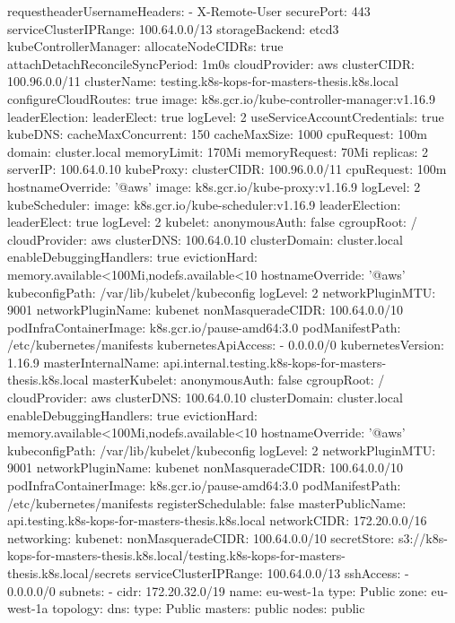     requestheaderUsernameHeaders:
    - X-Remote-User
    securePort: 443
    serviceClusterIPRange: 100.64.0.0/13
    storageBackend: etcd3
  kubeControllerManager:
    allocateNodeCIDRs: true
    attachDetachReconcileSyncPeriod: 1m0s
    cloudProvider: aws
    clusterCIDR: 100.96.0.0/11
    clusterName: testing.k8s-kops-for-masters-thesis.k8s.local
    configureCloudRoutes: true
    image: k8s.gcr.io/kube-controller-manager:v1.16.9
    leaderElection:
      leaderElect: true
    logLevel: 2
    useServiceAccountCredentials: true
  kubeDNS:
    cacheMaxConcurrent: 150
    cacheMaxSize: 1000
    cpuRequest: 100m
    domain: cluster.local
    memoryLimit: 170Mi
    memoryRequest: 70Mi
    replicas: 2
    serverIP: 100.64.0.10
  kubeProxy:
    clusterCIDR: 100.96.0.0/11
    cpuRequest: 100m
    hostnameOverride: '@aws'
    image: k8s.gcr.io/kube-proxy:v1.16.9
    logLevel: 2
  kubeScheduler:
    image: k8s.gcr.io/kube-scheduler:v1.16.9
    leaderElection:
      leaderElect: true
    logLevel: 2
  kubelet:
    anonymousAuth: false
    cgroupRoot: /
    cloudProvider: aws
    clusterDNS: 100.64.0.10
    clusterDomain: cluster.local
    enableDebuggingHandlers: true
    evictionHard: memory.available<100Mi,nodefs.available<10%
    hostnameOverride: '@aws'
    kubeconfigPath: /var/lib/kubelet/kubeconfig
    logLevel: 2
    networkPluginMTU: 9001
    networkPluginName: kubenet
    nonMasqueradeCIDR: 100.64.0.0/10
    podInfraContainerImage: k8s.gcr.io/pause-amd64:3.0
    podManifestPath: /etc/kubernetes/manifests
  kubernetesApiAccess:
  - 0.0.0.0/0
  kubernetesVersion: 1.16.9
  masterInternalName: api.internal.testing.k8s-kops-for-masters-thesis.k8s.local
  masterKubelet:
    anonymousAuth: false
    cgroupRoot: /
    cloudProvider: aws
    clusterDNS: 100.64.0.10
    clusterDomain: cluster.local
    enableDebuggingHandlers: true
    evictionHard: memory.available<100Mi,nodefs.available<10%
    hostnameOverride: '@aws'
    kubeconfigPath: /var/lib/kubelet/kubeconfig
    logLevel: 2
    networkPluginMTU: 9001
    networkPluginName: kubenet
    nonMasqueradeCIDR: 100.64.0.0/10
    podInfraContainerImage: k8s.gcr.io/pause-amd64:3.0
    podManifestPath: /etc/kubernetes/manifests
    registerSchedulable: false
  masterPublicName: api.testing.k8s-kops-for-masters-thesis.k8s.local
  networkCIDR: 172.20.0.0/16
  networking:
    kubenet: {}
  nonMasqueradeCIDR: 100.64.0.0/10
  secretStore: s3://k8s-kops-for-masters-thesis.k8s.local/testing.k8s-kops-for-masters-thesis.k8s.local/secrets
  serviceClusterIPRange: 100.64.0.0/13
  sshAccess:
  - 0.0.0.0/0
  subnets:
  - cidr: 172.20.32.0/19
    name: eu-west-1a
    type: Public
    zone: eu-west-1a
  topology:
    dns:
      type: Public
    masters: public
    nodes: public

